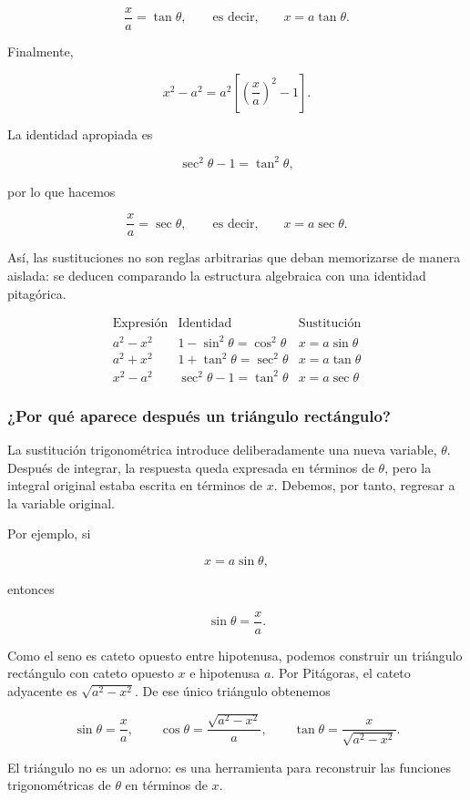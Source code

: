 \documentclass[12pt]{article}
\theoremstyle{definition}
\theoremstyle{remark}
\begin{document}
\[
\frac{x}{a}=\tan\theta,
\qquad\text{es decir,}\qquad
\boxed{x=a\tan\theta}.
\]

Finalmente,

\[
x^2-a^2=a^2\left[\left(\frac{x}{a}\right)^2-1\right].
\]

La identidad apropiada es

\[
\sec^2\theta-1=\tan^2\theta,
\]

por lo que hacemos

\[
\frac{x}{a}=\sec\theta,
\qquad\text{es decir,}\qquad
\boxed{x=a\sec\theta}.
\]

Así, las sustituciones no son reglas arbitrarias que deban memorizarse de
manera aislada: se deducen comparando la estructura algebraica con una
identidad pitagórica.

\[
\boxed{
\begin{array}{c|c|c}
\text{Expresión} & \text{Identidad} & \text{Sustitución}\\ \hline
 a^2-x^2 & 1-\sin^2\theta=\cos^2\theta & x=a\sin\theta\\[2mm]
 a^2+x^2 & 1+\tan^2\theta=\sec^2\theta & x=a\tan\theta\\[2mm]
 x^2-a^2 & \sec^2\theta-1=\tan^2\theta & x=a\sec\theta
\end{array}}
\]

\subsubsection*{¿Por qué aparece después un triángulo rectángulo?}

La sustitución trigonométrica introduce deliberadamente una nueva variable,
$\theta$. Después de integrar, la respuesta queda expresada en términos de
$\theta$, pero la integral original estaba escrita en términos de $x$.
Debemos, por tanto, regresar a la variable original.

Por ejemplo, si

\[
x=a\sin\theta,
\]

entonces

\[
\sin\theta=\frac{x}{a}.
\]

Como el seno es cateto opuesto entre hipotenusa, podemos construir un
triángulo rectángulo con cateto opuesto $x$ e hipotenusa $a$. Por Pitágoras,
el cateto adyacente es $\sqrt{a^2-x^2}$. De ese único triángulo obtenemos

\[
\sin\theta=\frac{x}{a},\qquad
\cos\theta=\frac{\sqrt{a^2-x^2}}{a},\qquad
\tan\theta=\frac{x}{\sqrt{a^2-x^2}}.
\]

El triángulo no es un adorno: es una herramienta para reconstruir las
funciones trigonométricas de $\theta$ en términos de $x$.
\end{document}
